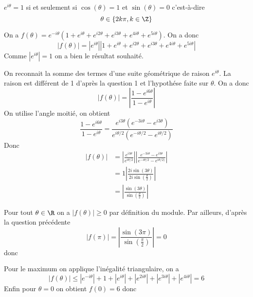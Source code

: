 \begin{correction}
$e^{i\theta}=1$ si et seulement si $\cos(\theta) = 1 $ et $\sin(\theta) =0$ c'est-à-dire 
$$\theta \in \{ 2k\pi , k \in \Z\}$$

On a $f(\theta) = e^{-i\theta} (1+e^{i \theta}+e^{i2 \theta}+e^{i3 \theta}+e^{4i \theta}+e^{5i \theta})$. On a donc 
$$|f(\theta)|=|e^{i\theta}| \left| 1+e^{i \theta}+e^{i2 \theta}+e^{i3 \theta}+e^{4i \theta}+e^{5i \theta}\right|$$
Comme $|e^{i\theta}| =1$ on a bien le résultat souhaité. 

On reconnait la somme des termes d'une suite géométrique de raison $e^{i\theta}$. La raison est différent de 1 d'après la question 1 et l'hypothése faite sur $\theta $.  On a donc 
$$\left| f(\theta)\right| =\left| \frac{1-e^{i6\theta}}{1-e^{i\theta}}\right|$$
On utilise l'angle moitié, on obtient 
$$ \frac{1-e^{i6\theta}}{1-e^{i\theta}} = \frac{e^{i3\theta}(e^{-3i\theta}-e^{i3\theta})}{e^{i\theta/2}(e^{-i\theta/2}-e^{i\theta/2})} $$
Donc 
\begin{align*}
\left| f(\theta)\right| &= \left| \frac{e^{i3\theta}}{e^{i\theta/2}} \right| \left|\frac{e^{-3i\theta}-e^{i3\theta}}{e^{-i\theta/2}-e^{i\theta/2)}}\right|\\
								&=1\left|\frac{2i \sin(3\theta)}{2i\sin(\frac{\theta}{2})}\right|\\
	&=\left| \frac{\sin(3\theta)}{\sin(\frac{\theta}{2})}\right|						
\end{align*}

Pour tout $\theta \in \R$ on a $|f(\theta)| \geq 0$ par définition du module. Par ailleurs, d'après la question précédente 
$$\left| f(\pi)\right|= \left| \frac{\sin(3\pi)}{\sin(\frac{\pi}{2})}\right|	=0$$
donc 
\begin{center}
\end{center}

Pour le maximum on applique l'inégalité triangulaire, on a 
$$\left| f(\theta)\right| \leq \left| e^{-i\theta}\right| + 1+\left| e^{i\theta}\right| + \left| e^{2i\theta}\right| + \left| e^{3i\theta}\right| + \left| e^{4i\theta}\right|=6$$
Enfin pour $\theta=0$ on obtient $f(0)=6$ donc 
\begin{center}
\end{center}

\end{correction}





